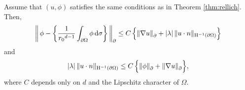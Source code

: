 \begin{lem}
  Assume that $(u,\phi)$ satisfies the same conditions as in Theorem \ref{thm:rellich}.
  Then,
  \begin{align}
    \label{eq:phiDashintPhi}
    \bigg\|\, \phi - \bigg\{ \frac{1}{{r_0}^{d - 1}}\int_{\partial\Omega} \phi \, {\operatorname{d}\!{\sigma}} \bigg\} \, \bigg\|^{}_\partial 
    \leq C\, \Big\{ \|\nabla u\|^{}_\partial + |\lambda| \, \|u\cdot n\|_{\mathrm{H}^{-1}(\partial\Omega)} \Big\}
  \end{align}
  and
  \begin{align}
    \label{eq:lambdaun}
    |\lambda|\, \| u\cdot n \|_{\mathrm{H}^{-1}(\partial\Omega)} \leq C\, \Big\{ \|\phi\|^{}_\partial + \|\nabla u\|^{}_\partial \Big\},
  \end{align}
  where $C$ depends only on $d$ and the Lipschitz character of $\Omega$.
\end{lem}

